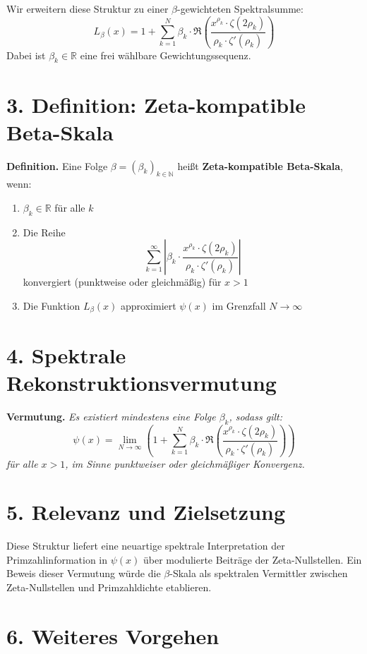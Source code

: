 \documentclass[12pt]{article}
\begin{document}
Wir erweitern diese Struktur zu einer \(\beta\)-gewichteten Spektralsumme:
\[
L_\beta(x) = 1 + \sum_{k=1}^{N} \beta_k \cdot \Re \left( \frac{x^{\rho_k} \cdot \zeta(2\rho_k)}{\rho_k \cdot \zeta'(\rho_k)} \right)
\]
Dabei ist \(\beta_k \in \mathbb{R}\) eine frei wählbare Gewichtungssequenz.

\section*{3. Definition: Zeta-kompatible Beta-Skala}

\textbf{Definition.} Eine Folge \(\beta = (\beta_k)_{k\in\mathbb{N}}\) heißt \textbf{Zeta-kompatible Beta-Skala}, wenn:

\begin{enumerate}
    \item \(\beta_k \in \mathbb{R}\) für alle \(k\)
    \item Die Reihe
    \[
    \sum_{k=1}^{\infty} \left| \beta_k \cdot \frac{x^{\rho_k} \cdot \zeta(2\rho_k)}{\rho_k \cdot \zeta'(\rho_k)} \right|
    \]
    konvergiert (punktweise oder gleichmäßig) für \(x > 1\)
    \item Die Funktion \(L_\beta(x)\) approximiert \(\psi(x)\) im Grenzfall \(N \to \infty\)
\end{enumerate}

\section*{4. Spektrale Rekonstruktionsvermutung}

\textbf{Vermutung.}
\textit{Es existiert mindestens eine Folge \(\beta_k\), sodass gilt:}
\[
\psi(x) = \lim_{N \to \infty} \left(1 + \sum_{k=1}^N \beta_k \cdot \Re \left( \frac{x^{\rho_k} \cdot \zeta(2\rho_k)}{\rho_k \cdot \zeta'(\rho_k)} \right) \right)
\]
\textit{für alle \(x > 1\), im Sinne punktweiser oder gleichmäßiger Konvergenz.}

\section*{5. Relevanz und Zielsetzung}

Diese Struktur liefert eine neuartige spektrale Interpretation der Primzahlinformation in \(\psi(x)\) über modulierte Beiträge der Zeta-Nullstellen. Ein Beweis dieser Vermutung würde die \(\beta\)-Skala als spektralen Vermittler zwischen Zeta-Nullstellen und Primzahldichte etablieren.

\section*{6. Weiteres Vorgehen}
\end{document}
